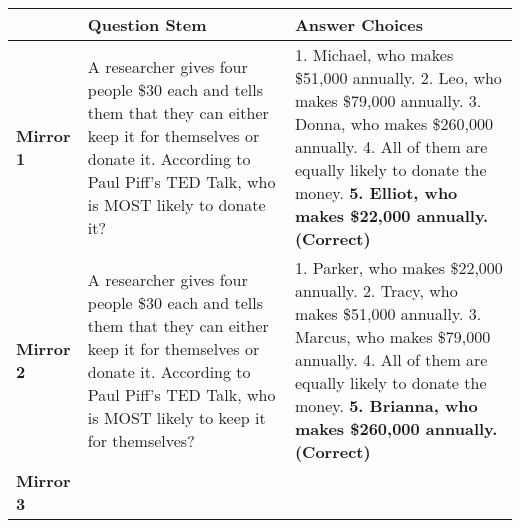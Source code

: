 \documentclass[
]{article}
\begin{document}
\begin{longtable}[]{@{}lll@{}}
\toprule
\begin{minipage}[b]{0.05\columnwidth}\raggedright
\strut
\end{minipage} & \begin{minipage}[b]{0.38\columnwidth}\raggedright
\textbf{Question Stem}\strut
\end{minipage} & \begin{minipage}[b]{0.48\columnwidth}\raggedright
\textbf{Answer Choices}\strut
\end{minipage}\tabularnewline
\midrule
\endhead
\begin{minipage}[t]{0.05\columnwidth}\raggedright
\textbf{Mirror 1}\strut
\end{minipage} & \begin{minipage}[t]{0.38\columnwidth}\raggedright
A researcher gives four people \$30 each and tells them that they can either keep it for themselves or donate it. According to Paul Piff's TED Talk, who is MOST likely to donate it?\strut
\end{minipage} & \begin{minipage}[t]{0.48\columnwidth}\raggedright
1. Michael, who makes \$51,000 annually. 2. Leo, who makes \$79,000 annually. 3. Donna, who makes \$260,000 annually. 4. All of them are equally likely to donate the money. \textbf{5. Elliot, who makes \$22,000 annually. (Correct)}\strut
\end{minipage}\tabularnewline
\begin{minipage}[t]{0.05\columnwidth}\raggedright
\textbf{Mirror 2}\strut
\end{minipage} & \begin{minipage}[t]{0.38\columnwidth}\raggedright
A researcher gives four people \$30 each and tells them that they can either keep it for themselves or donate it. According to Paul Piff's TED Talk, who is MOST likely to keep it for themselves?\strut
\end{minipage} & \begin{minipage}[t]{0.48\columnwidth}\raggedright
1. Parker, who makes \$22,000 annually. 2. Tracy, who makes \$51,000 annually. 3. Marcus, who makes \$79,000 annually. 4. All of them are equally likely to donate the money. \textbf{5. Brianna, who makes \$260,000 annually. (Correct)}\strut
\end{minipage}\tabularnewline
\begin{minipage}[t]{0.05\columnwidth}\raggedright
\textbf{Mirror 3}\strut
\end{minipage} & \begin{minipage}[t]{0.38\columnwidth}\raggedright

\end{minipage}
\end{longtable}
\end{document}

